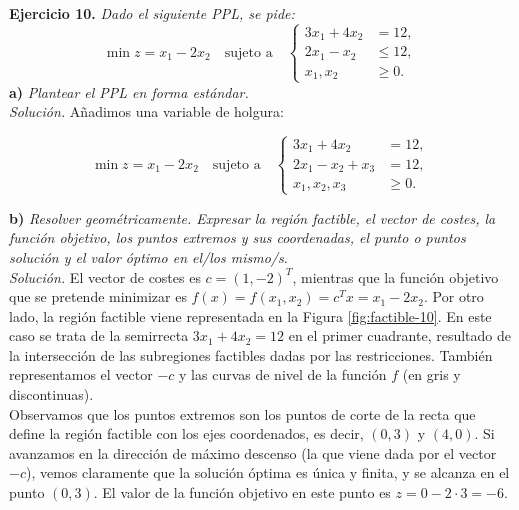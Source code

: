 \documentclass[11pt,a4paper]{article}
\begin{document}
\textbf{Ejercicio 10. } \emph{Dado el siguiente PPL, se pide:}
\begin{equation}\tag{P$10$}\label{eq:p10}
  \min z = x_{1} - 2x_{2} \quad \text{sujeto a} \quad \begin{cases} 3x_{1} + 4x_{2} &= 12,\\ 2x_{1} - x_{2} &\leq 12,\\ x_{1}, x_{2} &\geq 0. \end{cases}
\end{equation}
\textbf{a)} \emph{Plantear el PPL en forma estándar.}\\

\textit{Solución.} Añadimos una variable de holgura:

\begin{equation}\tag{P$10s$}\label{eq:p10s}
  \min z = x_{1} - 2x_{2} \quad \text{sujeto a} \quad \begin{cases} 3x_{1} + 4x_{2} &= 12,\\ 2x_{1} - x_{2} + x_3 &= 12,\\ x_{1}, x_{2}, x_3 &\geq 0. \end{cases}
\end{equation}

\textbf{b)} \emph{Resolver geométricamente. Expresar la región factible, el vector de costes, la función objetivo, los puntos extremos y sus coordenadas, el punto o puntos solución y el valor óptimo en el/los mismo/s}.\\

\textit{Solución.} El vector de costes es $c=(1, -2)^T$, mientras que la función objetivo que se pretende minimizar es $f(x)=f(x_1, x_2) = c^Tx=x_1-2x_2$. Por otro lado, la región factible viene representada en la Figura \ref{fig:factible-10}. En este caso se trata de la semirrecta $3x_1+4x_2=12$ en el primer cuadrante, resultado de la intersección de las subregiones factibles dadas por las restricciones. También representamos el vector $-c$ y las curvas de nivel de la función $f$ (en gris y discontinuas).\\

Observamos que los puntos extremos son los puntos de corte de la recta que define la región factible con los ejes coordenados, es decir, $(0, 3)$ y $(4, 0)$. Si avanzamos en la dirección de máximo descenso (la que viene dada por el vector $-c$), vemos claramente que la solución óptima es única y finita, y se alcanza en el punto $(0, 3)$. El valor de la función objetivo en este punto es $z=0 - 2\cdot 3=-6$.\\
\end{document}
